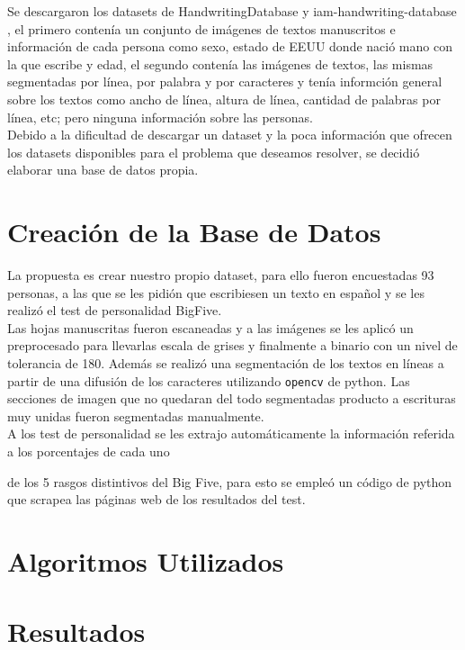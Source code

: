\documentclass[10pt, a4paper]{article}
\begin{document}
Se descargaron los datasets de HandwritingDatabase \cite{15} y iam-handwriting-database \cite{16}, el primero conten\'ia un conjunto de im\'agenes de textos manuscritos e informaci\'on de cada persona como sexo, estado de EEUU donde naci\'o 
mano con la que escribe y edad, el segundo conten\'ia las im\'agenes de textos, las mismas segmentadas por l\'inea, por palabra y por caracteres y ten\'ia informci\'on general sobre los textos como 
ancho de l\'inea, altura de l\'inea, cantidad de palabras por l\'inea, etc; pero ninguna informaci\'on sobre las personas. \\ 

Debido a la dificultad de descargar un dataset y la poca informaci\'on que ofrecen los datasets disponibles para el problema que deseamos resolver, se decidi\'o elaborar una base de datos propia.

\section{Creaci\'on de la Base de Datos}

La propuesta es crear nuestro propio dataset, para ello fueron encuestadas 93 personas, a las que se les pidi\'on que escribiesen un texto 
en espa\~nol y se les realiz\'o el test de personalidad BigFive. \\ 

Las hojas manuscritas fueron escaneadas y a las im\'agenes se les aplic\'o un preprocesado para llevarlas escala de grises y finalmente a binario con un nivel de tolerancia de 180. Adem\'as se 
realiz\'o una segmentaci\'on de los textos en l\'ineas a partir de una difusi\'on de los caracteres utilizando \texttt{opencv} de python. Las secciones de imagen que no quedaran 
del todo segmentadas producto a escrituras muy unidas fueron segmentadas manualmente.\\ 

A los test de personalidad se les extrajo autom\'aticamente la informaci\'on referida a los porcentajes de cada uno 

de los 5 rasgos distintivos del Big Five, para esto se emple\'o un c\'odigo de python que scrapea las p\'aginas web de los resultados del test.\\ 



\section{Algoritmos Utilizados}
\section{Resultados}
\end{document}
